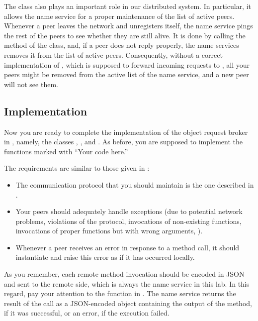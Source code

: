 \documentclass[a4paper]{article}
\begin{document}
The  class also plays an important role in our distributed
system. In particular, it allows the name service for a proper maintenance of
the list of active peers. Whenever a peer leaves the network and unregisters
itself, the name service pings the rest of the peers to see whether they are
still alive. It is done by calling the  method of the
 class, and, if a peer does not reply properly, the name
services removes it from the list of active peers. Consequently, without a
correct implementation of , which is supposed to forward
incoming requests to , all your peers might be removed from the
active list of the name service, and a new peer will not see them.

\subsection{Implementation}
Now you are ready to complete the implementation of the object request broker in
, namely, the classes , ,
and . As before, you are supposed to implement the functions
marked with ``Your code here.''

The requirements are similar to those given in :
\begin{itemize}

  \item The communication protocol that you should maintain is the one described
  in .

  \item Your peers should adequately handle exceptions (due to potential network
  problems, violations of the protocol, invocations of non-existing functions,
  invocations of proper functions but with wrong arguments, \etc).

  \item Whenever a peer receives an error in response to a method call, it
  should instantiate and raise this error as if it has occurred locally.

\end{itemize}
As you remember, each remote method invocation should be encoded in JSON and
sent to the remote side, which is always the name service in this lab. In this
regard, pay your attention to the  function in . The
name service returns the result of the call as a JSON-encoded object containing
the output of the method, if it was successful, or an error, if the execution
failed.
\end{document}
